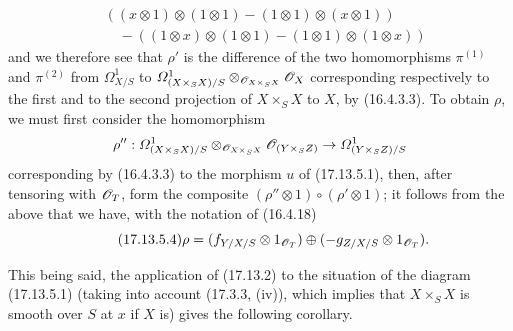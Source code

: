\begin{env}[17.13.5]
\[\begin{split}
&((x\otimes1)\otimes(1\otimes1)-(1\otimes1)\otimes(x\otimes1))\\
&\quad-((1\otimes x)\otimes(1\otimes1)-(1\otimes1)\otimes(1\otimes x))
\end{split}
\]
and we therefore see that $\rho'$ is the difference of the two homomorphisms $\pi^{(1)}$ and $\pi^{(2)}$ from $\varOmega^1_{X/S}$ to $\varOmega^1_{(X\times_SX)/S}\otimes_{\mathscr{O}_{X\times_SX}}\mathscr{O}_X$ corresponding respectively to the first and to the second projection of $X\times_SX$ to $X$, by (16.4.3.3). To obtain $\rho$, we must first consider the homomorphism
\[
\rho'':\varOmega^1_{(X\times_SX)/S}\otimes_{\mathscr{O}_{X\times_SX}}\mathscr{O}_{(Y\times_SZ)}\to\varOmega^1_{(Y\times_SZ)/S}
\]
corresponding by (16.4.3.3) to the morphism $u$ of (17.13.5.1), then, after tensoring with $\mathscr{O}_T$, form the composite $(\rho''\otimes1)\circ(\rho'\otimes1)$; it follows from the above that we have, with the notation of (16.4.18)
\[
\label{IV.17.13.5.4}
\tag{17.13.5.4}
\rho=(f_{Y/X/S}\otimes1_{\mathscr{O}_T})\oplus(-g_{Z/X/S}\otimes1_{\mathscr{O}_T}).
\]


This being said, the application of (17.13.2) to the situation of the diagram (17.13.5.1) (taking into account (17.3.3, (iv)), which implies that $X\times_SX$ is smooth over $S$ at $x$ if $X$ is) gives the following corollary.
\end{env}

